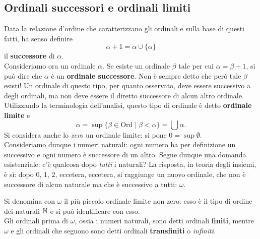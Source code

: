 \subsection{Ordinali successori e ordinali limiti}
Data la relazione d'ordine che caratterizzano gli ordinali e sulla base di questi fatti, ha senso definire
\begin{equation*}
	\alpha+1=\alpha\cup\{\alpha\}
\end{equation*}
il \textbf{successore} di $\alpha$.\\
Consideriamo ora un ordinale $\alpha$. Se esiste un ordinale $\beta$ tale per cui $\alpha=\beta+1$, si può dire che $\alpha$ è un \textbf{ordinale successore}. Non è sempre detto che però tale $\beta$ esisti! Un ordinale di questo tipo, per quanto osservato, deve essere successivo a degli ordinali, ma non deve essere il diretto successore di alcun altro ordinale. Utilizzando la terminologia dell'analisi, questo tipo di ordinale è detto \textbf{ordinale limite} e
\begin{equation}
	\alpha=\sup\{\beta\in\mathrm{Ord}\mid\beta<\alpha\}=\bigcup\alpha.
\end{equation}
Si considera anche lo \textit{zero} un ordinale limite: si pone $0=\sup\emptyset$.\\
Consideriamo dunque i numeri naturali: ogni numero ha per definizione un successivo e ogni numero è successore di un altro. Segue dunque una domanda esistenziale: c'è qualcosa dopo \textit{tutti} i naturali? La risposta, in teoria degli insiemi, è sì: dopo $0$, $1$, $2$, eccetera, eccetera, si raggiunge un nuovo ordinale, che non è successore di alcun naturale ma che è successivo a tutti: $\omega$.
\begin{define}
	Si denomina con $\omega$ il più piccolo ordinale limite non zero: esso è il tipo di ordine dei naturali $\mathbb{N}$ e si può identificare con esso.\\
	Gli ordinali prima di $\omega$, ossia i numeri naturali, sono detti ordinali \textbf{finiti}, mentre $\omega$ e gli ordinali che seguono sono detti ordinali \textbf{transfiniti} o \textit{infiniti}.
\end{define}
